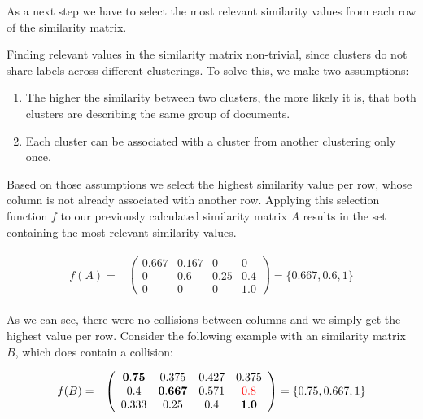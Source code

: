 As a next step we have to select the most relevant similarity values from each row of the similarity matrix.

Finding relevant values in the similarity matrix non-trivial, since clusters do not share labels across different clusterings. To solve this, we make two assumptions:
\begin{enumerate}
\item The higher the similarity between two clusters, the more likely it is, that both clusters are describing the same group of documents.
\item Each cluster can be associated with a cluster from another clustering only once.
\end{enumerate}

Based on those assumptions we select the highest similarity value per row, whose column is not already associated with another row. Applying this selection function $f$ to our previously calculated similarity matrix $A$ results in the set containing the most relevant similarity values.

\begin{gather*}
    \begin{array}{rcl}
        f(A) = & \left(\begin{array}{cccc}
            \mathbf{0.667} & 0.167 & 0 & 0 \\
            0 & \mathbf{0.6} & 0.25 & 0.4 \\
            0 &  0 & 0 & \mathbf{1.0} \end{array}\right)
            = \{0.667, 0.6, 1\}
    \end{array}
\end{gather*}

As we can see, there were no collisions between columns and we simply get the highest value per row. Consider the following example with an similarity matrix $B$, which does contain a collision:

\begin{gather*}
    \begin{array}{rcl}
        f(B) = & \left(\begin{array}{cccc}
            \mathbf{0.75} & 0.375 & 0.427 & 0.375 \\
            0.4 & \mathbf{0.667} & 0.571 & \textcolor{red}{0.8} \\
            0.333 &  0.25 & 0.4 & \mathbf{1.0} \end{array}\right)
            = \{0.75, 0.667, 1\}
    \end{array}
\end{gather*}

